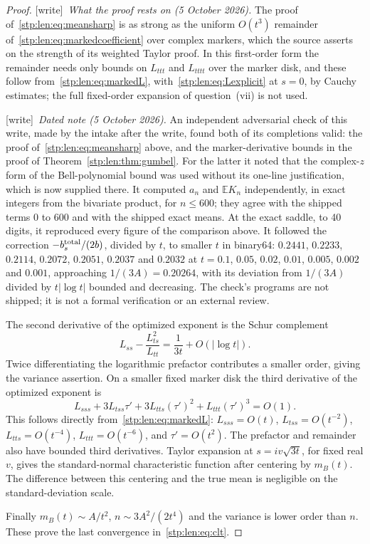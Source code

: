 \documentclass[11pt]{article}
\theoremstyle{remark}\newtheorem{remark}[theorem]{Remark}
\newcommand{\E}{\mathbb E}
\newcommand{\wtag}{\textup{[write]}}
\begin{document}
\begin{proof}
\wtag\ \emph{What the proof rests on (5 October 2026).} The proof
of~\eqref{stp:len:eq:meansharp} is as strong as the uniform $O(t^3)$
remainder of~\eqref{stp:len:eq:markedcoefficient} over complex markers,
which the source asserts on the strength of its weighted Taylor proof. In
this first-order form the remainder needs only bounds on $L_{ttt}$ and
$L_{tttt}$ over the marker disk, and these follow
from~\eqref{stp:len:eq:markedL}, with~\eqref{stp:len:eq:Lexplicit} at $s=0$,
by Cauchy estimates; the full fixed-order expansion of question~(vii) is not
used.

\wtag\ \emph{Dated note (5 October 2026).} An independent adversarial check
of this write, made by the intake after the write, found both of its
completions valid: the proof of~\eqref{stp:len:eq:meansharp} above, and the
marker-derivative bounds in the proof of Theorem~\ref{stp:len:thm:gumbel}.
For the latter it noted that the complex-$z$ form of the Bell-polynomial
bound was used without its one-line justification, which is now supplied
there. It computed $a_n$ and $\E K_n$ independently, in exact integers from
the bivariate product, for $n\le600$; they agree with the shipped terms
$0$ to $600$ and with the shipped exact means. At the exact saddle, to
40 digits, it reproduced every figure of the comparison above. It followed
the correction $-b_s^{\rm total}/(2b)$, divided by $t$, to smaller $t$ in
binary64: $0.2441$, $0.2233$, $0.2114$, $0.2072$, $0.2051$, $0.2037$ and
$0.2032$ at $t=0.1$, $0.05$, $0.02$, $0.01$, $0.005$, $0.002$ and $0.001$,
approaching $1/(3A)=0.20264$, with its deviation from $1/(3A)$ divided by
$t|\log t|$ bounded and decreasing. The check's programs are not shipped; it
is not a formal verification or an external review.



The second derivative of the optimized exponent is the Schur complement
\[
 L_{ss}-\frac{L_{ts}^2}{L_{tt}}=\frac1{3t}+O(|\log t|).
\]
Twice differentiating the logarithmic prefactor contributes a smaller order, giving the variance assertion. On a smaller fixed marker disk the third derivative of the optimized exponent is
\[
 L_{sss}+3L_{tss}\tau'+3L_{tts}(\tau')^2+L_{ttt}(\tau')^3=O(1).
\]
This follows directly from~\eqref{stp:len:eq:markedL}: $L_{sss}=O(t)$, $L_{tss}=O(t^{-2})$, $L_{tts}=O(t^{-4})$, $L_{ttt}=O(t^{-6})$, and $\tau'=O(t^2)$. The prefactor and remainder also have bounded third derivatives. Taylor expansion at $s=iv\sqrt{3t}$, for fixed real $v$, gives the standard-normal characteristic function after centering by $m_B(t)$. The difference between this centering and the true mean is negligible on the standard-deviation scale.

Finally $m_B(t)\sim A/t^2$, $n\sim3A^2/(2t^4)$ and the variance is lower order than $n$. These prove the last convergence in~\eqref{stp:len:eq:clt}.
\end{proof}
\end{document}
